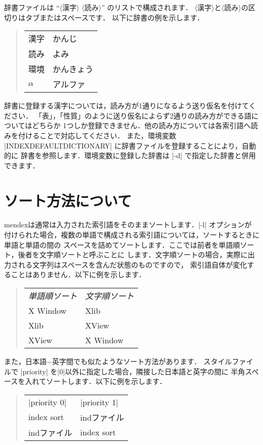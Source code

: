 \documentclass[a4paper,dvipdfmx]{jsarticle}
\newcommand{\SoftName}[1]{\textsf{#1}}
\newcommand{\jMeta}[1]{$\langle$\mbox{}\textsf{#1}\mbox{}$\rangle$}
\begin{document}
辞書ファイルは ``\jMeta{漢字} \jMeta{読み}'' のリストで構成されます．
\jMeta{漢字}と\jMeta{読み}の区切りはタブまたはスペースです．
以下に辞書の例を示します．
%
\begin{quote}
\begin{tabular}{ll}
漢字 & かんじ \\
読み & よみ \\
環境 & かんきょう \\
$\alpha$ & アルファ
\end{tabular}
\end{quote}

辞書に登録する漢字については，読み方が1通りになるよう送り仮名を付けてください．
「表」，「性質」のように送り仮名によらず2通りの読み方ができる語についてはどちらか
1つしか登録できません．他の読み方については各索引語へ読みを付けることで対応してください．
また，環境変数 |INDEXDEFAULTDICTIONARY| に辞書ファイルを登録することにより，自動的に
辞書を参照します．環境変数に登録した辞書は |-d| で指定した辞書と併用できます．

\section{ソート方法について}

\SoftName{mendex}は通常は入力された索引語をそのままソートします．|-l| オプションが
付けられた場合，複数の単語で構成される索引語については，ソートするときに単語と単語の間の
スペースを詰めてソートします．ここでは前者を単語順ソート，後者を文字順ソートと呼ぶことに
します．文字順ソートの場合，実際に出力される文字列はスペースを含んだ状態のものですので，
索引語自体が変化することはありません．以下に例を示します．
%
\begin{quote}
\begin{tabular}{ll}
\emph{単語順ソート} & \emph{文字順ソート} \\
X Window & Xlib \\
Xlib & XView \\
XView & X Window
\end{tabular}
\end{quote}

また，日本語−英字間でも似たようなソート方法があります．
スタイルファイルで |priority| を|0|以外に指定した場合，隣接した日本語と英字の間に
半角スペースを入れてソートします．以下に例を示します．
%
\begin{quote}
\begin{tabular}{ll}
|priority 0| & |priority 1| \\
index sort & indファイル \\
indファイル & index sort
\end{tabular}
\end{quote}
\end{document}
